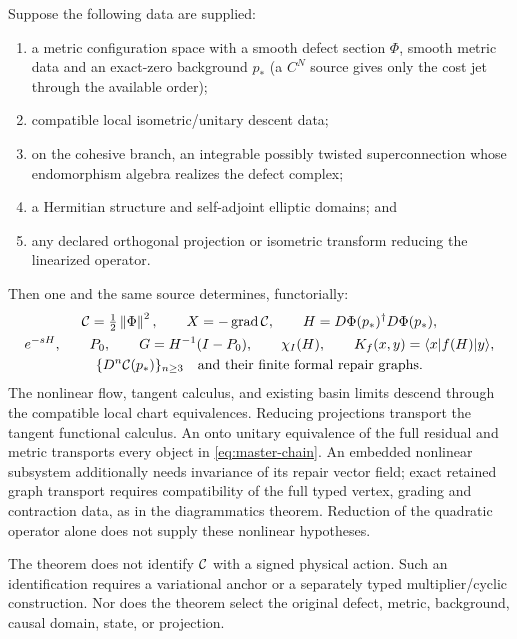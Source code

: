 \documentclass[11pt,a4paper]{article}
\begin{document}
\begin{theorem}
\label{thm:master}
Suppose the following data are supplied:
\begin{enumerate}
\item a metric configuration space with a smooth defect
section \(\Phi\), smooth metric data and an exact-zero background \(p_*\)
(a \(C^N\) source gives only the cost jet through the available order);
\item compatible local isometric/unitary descent data;
\item on the cohesive branch, an integrable possibly twisted
superconnection whose endomorphism algebra realizes the defect complex;
\item a Hermitian structure and self-adjoint elliptic domains; and
\item any declared orthogonal projection or isometric transform reducing the
linearized operator.
\end{enumerate}
Then one and the same source determines, functorially:
\begin{equation}
\begin{gathered}
\mathcal{C}=\tfrac12\left\lVert \Phi \right\rVert^2,
\qquad
X=-\operatorname{grad}\mathcal{C},
\qquad
H=D\Phi(p_*)^{\dagger}D\Phi(p_*),\\
e^{-sH},
\qquad
P_0,
\qquad
G=H^{-1}(I-P_0),
\qquad
\chi_I(H),
\qquad
K_f(x,y)=\langle x|f(H)|y\rangle,\\
\{D^n\mathcal{C}(p_*)\}_{n\geq3}
\quad\text{and their finite formal repair graphs}.
\end{gathered}
\label{eq:master-chain}
\end{equation}
The nonlinear flow, tangent calculus, and existing basin limits descend
through the compatible local chart equivalences.
Reducing projections transport the tangent functional calculus.
An onto unitary equivalence of the full residual and metric transports
every object in \eqref{eq:master-chain}. An embedded nonlinear subsystem
additionally needs invariance of its repair vector field; exact retained
graph transport requires compatibility of the full typed vertex, grading
and contraction data, as in the diagrammatics theorem. Reduction of the
quadratic operator alone does not supply these nonlinear hypotheses.

The theorem does not identify \(\mathcal{C}\) with a signed physical action.  Such
an identification requires a variational anchor or a separately typed
multiplier/cyclic construction.  Nor does the theorem select the original
defect, metric, background, causal domain, state, or projection.
\end{theorem}
\end{document}

